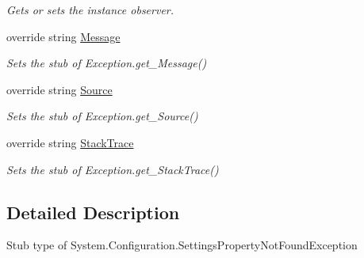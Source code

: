 \begin{DoxyCompactItemize}
\begin{DoxyCompactList}\small\item\em Gets or sets the instance observer.\end{DoxyCompactList}\item 
override string \hyperlink{class_system_1_1_configuration_1_1_fakes_1_1_stub_settings_property_not_found_exception_aeff9274413b44dfea341f7b9b45a1349}{Message}
\begin{DoxyCompactList}\small\item\em Sets the stub of Exception.\-get\-\_\-\-Message()\end{DoxyCompactList}\item 
override string \hyperlink{class_system_1_1_configuration_1_1_fakes_1_1_stub_settings_property_not_found_exception_ad8ea4aa21668c5cca32e55d8e38cc423}{Source}
\begin{DoxyCompactList}\small\item\em Sets the stub of Exception.\-get\-\_\-\-Source()\end{DoxyCompactList}\item 
override string \hyperlink{class_system_1_1_configuration_1_1_fakes_1_1_stub_settings_property_not_found_exception_a2c0bf5aaee923dd58962e352ddea5fd5}{Stack\-Trace}
\begin{DoxyCompactList}\small\item\em Sets the stub of Exception.\-get\-\_\-\-Stack\-Trace()\end{DoxyCompactList}\end{DoxyCompactItemize}


\subsection{Detailed Description}
Stub type of System.\-Configuration.\-Settings\-Property\-Not\-Found\-Exception



